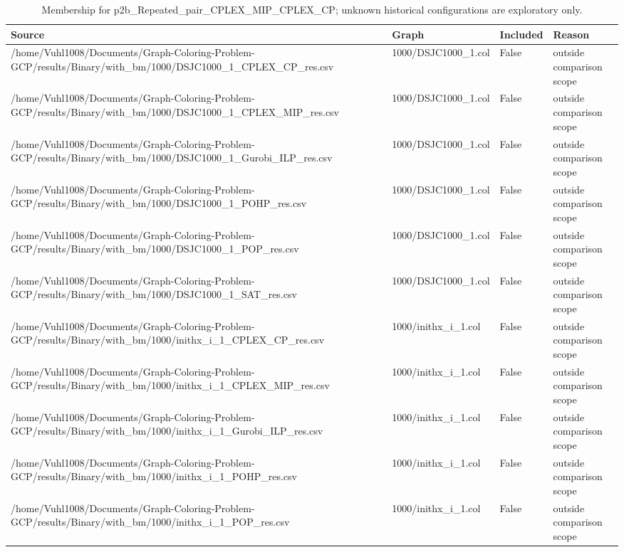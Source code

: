 \begin{table}[htbp]
\centering
\caption{Membership for p2b\_Repeated\_pair\_CPLEX\_MIP\_CPLEX\_CP; unknown historical configurations are exploratory only.}
\label{tab:p2b-Repeated-pair-CPLEX-MIP-CPLEX-CP-membership}
\begin{tabular}{llll}
\hline
Source & Graph & Included & Reason \\
\hline
/home/Vuhl1008/Documents/Graph-Coloring-Problem-GCP/results/Binary/with\_bm/1000/DSJC1000\_1\_CPLEX\_CP\_res.csv & 1000/DSJC1000\_1.col & False & outside comparison scope \\
/home/Vuhl1008/Documents/Graph-Coloring-Problem-GCP/results/Binary/with\_bm/1000/DSJC1000\_1\_CPLEX\_MIP\_res.csv & 1000/DSJC1000\_1.col & False & outside comparison scope \\
/home/Vuhl1008/Documents/Graph-Coloring-Problem-GCP/results/Binary/with\_bm/1000/DSJC1000\_1\_Gurobi\_ILP\_res.csv & 1000/DSJC1000\_1.col & False & outside comparison scope \\
/home/Vuhl1008/Documents/Graph-Coloring-Problem-GCP/results/Binary/with\_bm/1000/DSJC1000\_1\_POHP\_res.csv & 1000/DSJC1000\_1.col & False & outside comparison scope \\
/home/Vuhl1008/Documents/Graph-Coloring-Problem-GCP/results/Binary/with\_bm/1000/DSJC1000\_1\_POP\_res.csv & 1000/DSJC1000\_1.col & False & outside comparison scope \\
/home/Vuhl1008/Documents/Graph-Coloring-Problem-GCP/results/Binary/with\_bm/1000/DSJC1000\_1\_SAT\_res.csv & 1000/DSJC1000\_1.col & False & outside comparison scope \\
/home/Vuhl1008/Documents/Graph-Coloring-Problem-GCP/results/Binary/with\_bm/1000/inithx\_i\_1\_CPLEX\_CP\_res.csv & 1000/inithx\_i\_1.col & False & outside comparison scope \\
/home/Vuhl1008/Documents/Graph-Coloring-Problem-GCP/results/Binary/with\_bm/1000/inithx\_i\_1\_CPLEX\_MIP\_res.csv & 1000/inithx\_i\_1.col & False & outside comparison scope \\
/home/Vuhl1008/Documents/Graph-Coloring-Problem-GCP/results/Binary/with\_bm/1000/inithx\_i\_1\_Gurobi\_ILP\_res.csv & 1000/inithx\_i\_1.col & False & outside comparison scope \\
/home/Vuhl1008/Documents/Graph-Coloring-Problem-GCP/results/Binary/with\_bm/1000/inithx\_i\_1\_POHP\_res.csv & 1000/inithx\_i\_1.col & False & outside comparison scope \\
/home/Vuhl1008/Documents/Graph-Coloring-Problem-GCP/results/Binary/with\_bm/1000/inithx\_i\_1\_POP\_res.csv & 1000/inithx\_i\_1.col & False & outside comparison scope \\

\end{tabular}
\end{table}
